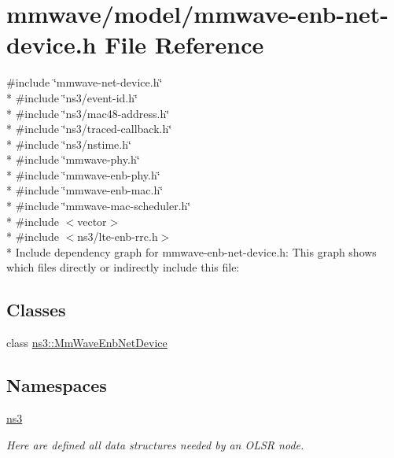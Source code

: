 \hypertarget{mmwave-enb-net-device_8h}{}\section{mmwave/model/mmwave-\/enb-\/net-\/device.h File Reference}
\label{mmwave-enb-net-device_8h}
{\ttfamily \#include \char`\"{}mmwave-\/net-\/device.\+h\char`\"{}}\\*
{\ttfamily \#include \char`\"{}ns3/event-\/id.\+h\char`\"{}}\\*
{\ttfamily \#include \char`\"{}ns3/mac48-\/address.\+h\char`\"{}}\\*
{\ttfamily \#include \char`\"{}ns3/traced-\/callback.\+h\char`\"{}}\\*
{\ttfamily \#include \char`\"{}ns3/nstime.\+h\char`\"{}}\\*
{\ttfamily \#include \char`\"{}mmwave-\/phy.\+h\char`\"{}}\\*
{\ttfamily \#include \char`\"{}mmwave-\/enb-\/phy.\+h\char`\"{}}\\*
{\ttfamily \#include \char`\"{}mmwave-\/enb-\/mac.\+h\char`\"{}}\\*
{\ttfamily \#include \char`\"{}mmwave-\/mac-\/scheduler.\+h\char`\"{}}\\*
{\ttfamily \#include $<$vector$>$}\\*
{\ttfamily \#include $<$ns3/lte-\/enb-\/rrc.\+h$>$}\\*
Include dependency graph for mmwave-\/enb-\/net-\/device.h\+:
This graph shows which files directly or indirectly include this file\+:
\subsection*{Classes}
\begin{DoxyCompactItemize}
\item 
class \hyperlink{classns3_1_1MmWaveEnbNetDevice}{ns3\+::\+Mm\+Wave\+Enb\+Net\+Device}
\end{DoxyCompactItemize}
\subsection*{Namespaces}
\begin{DoxyCompactItemize}
\item 
 \hyperlink{namespacens3}{ns3}
\begin{DoxyCompactList}\small\item\em Here are defined all data structures needed by an O\+L\+SR node. \end{DoxyCompactList}\end{DoxyCompactItemize}
